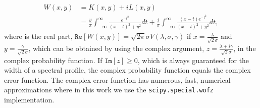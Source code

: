 \documentclass[a4paper,fleqn,usenatbib]{mnras}
\begin{document}
\begin{equation} 
	\begin{split}
		W(x, y)  
		& = K(x, y) + i L(x, y) \\
		& = \frac{y}{\pi}  \int_{-\infty}^{\infty} \frac{e^{- t^2 }}{(x -  t)^2 +y^2} dt  + \frac{i}{\pi}  \int_{-\infty}^{\infty} \frac{(x - t)e^{- t^2 }}{(x -  t)^2 +y^2} dt,
	\end{split}
\end{equation}
where is the real part, $\mathtt{Re}[W(x, y)] =  \sqrt{2 \pi} \sigma V(\lambda,\sigma, \gamma)$ if $x = \frac{\lambda}{\sqrt{2} \sigma}$ and $y = \frac{\gamma}{\sqrt{2} \sigma}$, which can be obtained by using the complex argument, $z = \frac{\lambda + i\gamma}{\sqrt{2} \sigma}$, in the complex probability function. If $\mathtt{Im}[z] \geq 0$, which is always guaranteed for the width of a spectral profile, the complex probability function equals the complex error function. The complex error function has numerous, fast, numerical approximations where in this work we use the \texttt{scipy.special.wofz} \citep{scipy} implementation.





\bsp	%
\label{lastpage}
\end{document}
